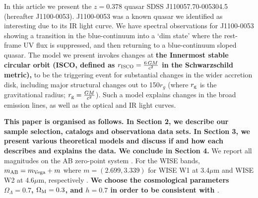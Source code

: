 \documentclass[a4paper,fleqn,usenatbib]{mnras}
\begin{document}
In this article we present the $z=0.378$ quasar SDSS J110057.70-005304.5 (hereafter J1100-0053).  J1100-0053 was a known quasar we identified as interesting due to its IR light curve. We have spectral observations for J1100-0053 showing a transition in the blue-continuum into a `dim state' where the rest-frame UV flux is suppressed, and then returning to a blue-continuum sloped quasar.  The model we present invokes changes at {\bf the Innermost stable circular orbit (ISCO, defined as $r_{\textsc{ISCO}}={\frac {6\,GM}{c^{2}}}$ in the Schwarzschild metric),} to be the triggering event for substantial changes in the wider accretion disk, including major structural changes out to 150$r_{g}$ (where $r_{\rm g}$ is the gravitational radius; $r_{\rm g}=\frac{GM}{c^2}$). Such a model explains changes in the broad emission lines, as well as the optical and IR light curves.

{\bf This paper is organised as follows.  In Section 2, we describe
our sample selection, catalogs and observationa data sets.  In Section
3, we present various theoretical models and discuss if and how each
describes and explains the data.  We conclude in Section 4.}  We
report all magnitudes on the AB zero-point system \citep{Oke_Gunn1983,
Fukugita1996}.  For the WISE bands, $m_{\rm AB} = m_{\rm Vega} + m$
where $m = (2.699, 3.339)$ for WISE W1 at 3.4$\mu$m and WISE W2 at
4.6$\mu$m, respectively \citep{Cutri2011}. {\bf We choose the
cosmological parameters $\Omega_{\Lambda} = 0.7$, $\Omega_{\rm M} =
0.3$, and $h = 0.7$ in order to be consistent with \citet{Shen2011}}.
\end{document}
